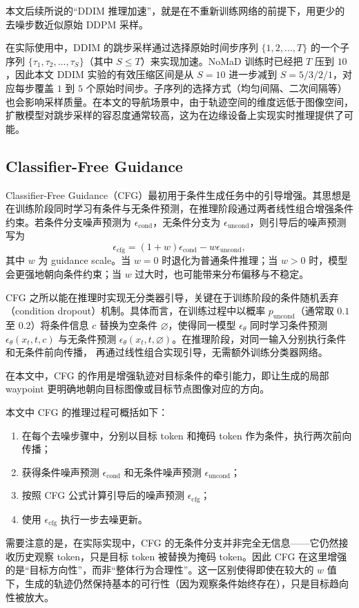 本文后续所说的``DDIM 推理加速''，就是在不重新训练网络的前提下，用更少的去噪步数近似原始 DDPM 采样。

在实际使用中，DDIM 的跳步采样通过选择原始时间步序列 $\{1, 2, \ldots, T\}$ 的一个子序列 $\{\tau_1, \tau_2, \ldots, \tau_S\}$（其中 $S \le T$）来实现加速。NoMaD 训练时已经把 $T$ 压到 $10$，因此本文 DDIM 实验的有效压缩区间是从 $S = 10$ 进一步减到 $S = 5/3/2/1$，对应每步覆盖 $1$ 到 $5$ 个原始时间步。子序列的选择方式（均匀间隔、二次间隔等）也会影响采样质量。在本文的导航场景中，由于轨迹空间的维度远低于图像空间，扩散模型对跳步采样的容忍度通常较高，这为在边缘设备上实现实时推理提供了可能。

\subsection{Classifier-Free Guidance}

Classifier-Free Guidance（CFG）最初用于条件生成任务中的引导增强\cite{cfg2022}。其思想是在训练阶段同时学习有条件与无条件预测，在推理阶段通过两者线性组合增强条件约束。若条件分支噪声预测为 $\epsilon_{\text{cond}}$，无条件分支为 $\epsilon_{\text{uncond}}$，则引导后的噪声预测写为
\begin{equation}
\epsilon_{\text{cfg}} = (1+w)\epsilon_{\text{cond}} - w\epsilon_{\text{uncond}},
\end{equation}
其中 $w$ 为 guidance scale。当 $w=0$ 时退化为普通条件推理；当 $w>0$ 时，模型会更强地朝向条件约束；当 $w$ 过大时，也可能带来分布偏移与不稳定。

CFG 之所以能在推理时实现无分类器引导，关键在于训练阶段的条件随机丢弃（condition dropout）机制。具体而言，在训练过程中以概率 $p_{\text{uncond}}$（通常取 $0.1$ 至 $0.2$）将条件信息 $c$ 替换为空条件 $\varnothing$，使得同一模型 $\epsilon_\theta$ 同时学习条件预测 $\epsilon_\theta(x_t, t, c)$ 与无条件预测 $\epsilon_\theta(x_t, t, \varnothing)$。在推理阶段，对同一输入分别执行条件和无条件前向传播，
再通过线性组合实现引导，无需额外训练分类器网络。


在本文中，CFG 的作用是增强轨迹对目标条件的牵引能力，即让生成的局部 waypoint 更明确地朝向目标图像或目标节点图像对应的方向。

本文中 CFG 的推理过程可概括如下：
\begin{enumerate}
    \item 在每个去噪步骤中，分别以目标 token 和掩码 token 作为条件，执行两次前向传播；
    \item 获得条件噪声预测 $\epsilon_{\text{cond}}$ 和无条件噪声预测 $\epsilon_{\text{uncond}}$；
    \item 按照 CFG 公式计算引导后的噪声预测 $\epsilon_{\text{cfg}}$；
    \item 使用 $\epsilon_{\text{cfg}}$ 执行一步去噪更新。
\end{enumerate}
需要注意的是，在实际实现中，CFG 的无条件分支并非完全无信息——它仍然接收历史观察 token，只是目标 token 被替换为掩码 token。因此 CFG 在这里增强的是``目标方向性''，而非``整体行为合理性''。这一区别使得即使在较大的 $w$ 值下，生成的轨迹仍然保持基本的可行性（因为观察条件始终存在），只是目标趋向性被放大。

